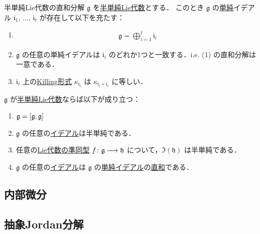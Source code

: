 \documentclass[rep_main]{subfiles}
\begin{document}
\begin{mytheo}[label=thm:semisimple-decomp]{半単純Lie代数の直和分解}
	$\mathfrak{g}$ を\hyperref[def:semisimple-LieAlg]{半単純Lie代数}とする．
	このとき $\mathfrak{g}$ の\hyperref[def:simple-LieAlg]{単純}イデアル $\mathfrak{i}_1,\, \dots,\, \mathfrak{i}_t$ が存在して以下を充たす：
	\begin{enumerate}
		\item \begin{align}
			\mathfrak{g} = \bigoplus_{i = 1}^t \mathfrak{i}_i
		\end{align}
		\item $\mathfrak{g}$ の任意の単純イデアルは $\mathfrak{i}_i$ のどれか1つと一致する．i.e. (1) の直和分解は一意である．
		\item $\mathfrak{i}_i$ 上の\hyperref[def:Killing-form]{Killing形式} $\kappa_{\mathfrak{i}_i}$ は $\kappa_{\mathfrak{i}_i \times \mathfrak{i}_i}$ に等しい．
	\end{enumerate}
	
\end{mytheo}

\begin{mycol}[label=col:semisimple-decomp]{}
	$\mathfrak{g}$ が\hyperref[def:semisimple-LieAlg]{半単純Lie代数}ならば以下が成り立つ：
	\begin{enumerate}
		\item $\mathfrak{g} = \comm{\mathfrak{g}}{\mathfrak{g}}$
		\item $\mathfrak{g}$ の任意の\hyperref[def:ideal-LieAlg]{イデアル}は半単純である．
		\item 任意の\hyperref[def:hom-LieAlg]{Lie代数の準同型} $f \colon \mathfrak{g} \longrightarrow \mathfrak{h}$ について，$\Im (\mathfrak{h})$ は半単純である．
		\item $\mathfrak{g}$ の任意の\hyperref[def:ideal-LieAlg]{イデアル}は $\mathfrak{g}$ の\hyperref[def:simple-LieAlg]{単純イデアル}の\hyperref[prop:subvec-directsum]{直和}である．
	\end{enumerate}
	
\end{mycol}

\subsection{内部微分}
\subsection{抽象Jordan分解}
\end{document}
